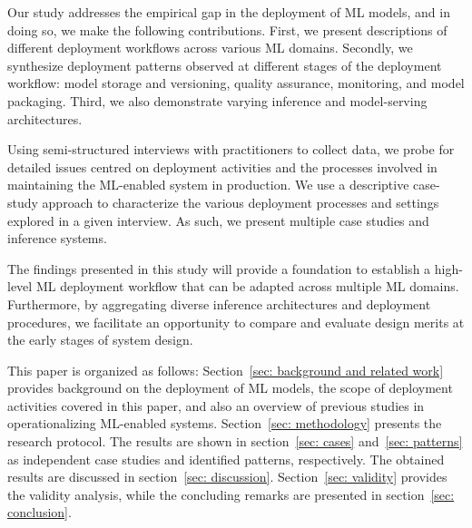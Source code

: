 Our study addresses the empirical gap in the deployment of ML models, and in doing so, we make the following contributions. First, we present descriptions of different deployment workflows across various ML domains. Secondly, we synthesize deployment patterns observed at different stages of the deployment workflow: model storage and versioning, quality assurance, monitoring, and model packaging. Third, we also demonstrate varying inference and model-serving architectures.

Using semi-structured interviews with practitioners to collect data, we probe for detailed issues centred on deployment activities and the processes involved in maintaining the ML-enabled system in production. We use a descriptive case-study approach to characterize the various deployment processes and settings explored in a given interview. As such, we present multiple case studies and inference systems.

The findings presented in this study will provide a foundation to establish a high-level ML deployment workflow that can be adapted across multiple ML domains. Furthermore, by aggregating diverse inference architectures and deployment procedures, we facilitate an opportunity to compare and evaluate design merits at the early stages of system design. %

This paper is organized as follows: Section~\ref{sec: background and related work} provides background on the deployment of ML models, the scope of deployment activities covered in this paper, and also an overview of previous studies in operationalizing ML-enabled systems. Section~\ref{sec: methodology} presents the research protocol. The results are shown in section~\ref{sec: cases} and~\ref{sec: patterns} as independent case studies and identified patterns, respectively. The obtained results are discussed in section~\ref{sec: discussion}. Section~\ref{sec: validity} provides the validity analysis, while the concluding remarks are presented in section~\ref{sec: conclusion}.

